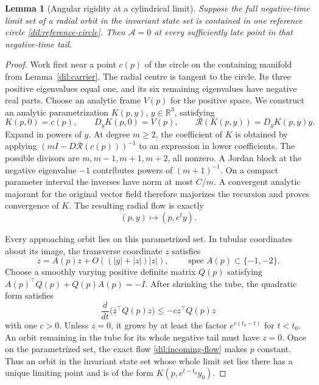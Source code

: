 \documentclass[11pt,a4paper]{article}
\numberwithin{equation}{section}
\theoremstyle{plain}
\newtheorem{lemma}[theorem]{Lemma}
\theoremstyle{definition}
\theoremstyle{remark}
\begin{document}
\begin{lemma}[Angular rigidity at a cylindrical limit]\label{dil:incoming}
Suppose the full negative-time limit set of a radial orbit in the invariant state set is
contained in one reference circle \eqref{dil:reference-circle}.  Then
$\mathcal A=0$ at every sufficiently late point in that negative-time
tail.  
\end{lemma}
\begin{proof}
Work first near a point $c(p)$ of the circle on the containing
manifold from Lemma~\ref{dil:carrier}. The radial centre is tangent
to the circle. Its three positive eigenvalues equal one, and its
six remaining eigenvalues have negative real parts.
Choose an analytic frame $V(p)$ for the positive
space.  We construct an analytic parametrization $K(p,y)$,
$y\in\mathbb R^3$, satisfying
\begin{equation}\label{dil:incoming-param}
 K(p,0)=c(p),\qquad D_yK(p,0)=V(p),\qquad
 \mathcal R(K(p,y))=D_yK(p,y)y.
\end{equation}
Expand in powers of $y$.  At degree $m\ge2$, the coefficient of $K$
is obtained by applying
$(mI-D\mathcal R(c(p)))^{-1}$ to an expression in lower coefficients.
The possible divisors are $m,m-1,m+1,m+2$, all nonzero.  A Jordan
block at the negative eigenvalue $-1$ contributes powers of
$(m+1)^{-1}$.  On a compact parameter interval
the inverses have norm at most $C/m$.  A convergent analytic
majorant for the original vector field therefore majorizes the
recursion and proves convergence of $K$.  The resulting radial
flow is exactly
\begin{equation}\label{dil:incoming-flow}
                  (p,y)\longmapsto(p,e^t y).
\end{equation}

Every approaching orbit lies on this parametrized set. In tubular
coordinates about its image,
the transverse coordinate $z$ satisfies
\[
 \dot z=A(p)z+O((|y|+|z|)|z|),
 \qquad \operatorname{spec}A(p)\subset\{-1,-2\}.
\]
Choose a smoothly varying positive definite matrix $Q(p)$ satisfying
$A(p)^{\top}Q(p)+Q(p)A(p)=-I$.    After shrinking the tube,
the quadratic form satisfies
\[
 \frac{d}{dt}\bigl(z^{\top}Q(p)z\bigr)\le-cz^{\top}Q(p)z
\]
with one $c>0$. Unless $z=0$, it grows by at least the factor
$e^{c(t_0-t)}$ for $t<t_0$.
An orbit remaining in the tube for its whole negative tail must
have $z=0$. Once on the parametrized set, the exact flow
\eqref{dil:incoming-flow} makes $p$ constant.  Thus an orbit in the invariant state set
whose whole limit set lies there has a unique limiting point and
is of the form
$K(p,e^{t-t_0}y_0)$.  


\end{proof}
\end{document}
